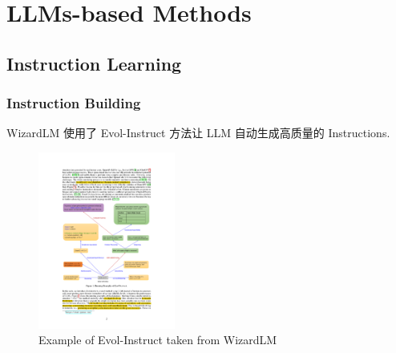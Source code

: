 \section{LLMs-based Methods}
\subsection{Instruction Learning}
\begin{frame}
	\frametitle{Instruction Building}
	WizardLM 使用了 Evol-Instruct 方法让 LLM 自动生成高质量的 Instructions.
	\begin{figure}[h]
		\begin{center}
	\includegraphics[width=0.4\textwidth]{pic/WizardLM.pdf}
		\end{center}
		\caption{Example of Evol-Instruct taken from WizardLM}
		\label{Evol-Instruct}
	\end{figure}
\end{frame}


